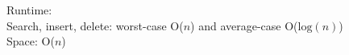 
Runtime: \\
\indent Search, insert, delete: worst-case O($n$) and average-case O($\text{log}(n)$) \\
Space: O($n$)



\newpage